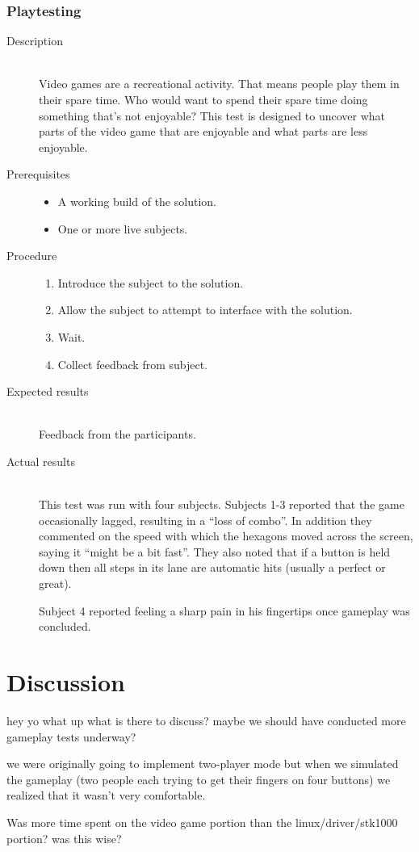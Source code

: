 	\subsubsection{Playtesting}
	\begin{description}
		\item[Description] \hfill \\
			Video games are a recreational activity.
			That means people play them in their spare time.
			Who would want to spend their spare time doing something that's not enjoyable?
			This test is designed to uncover what parts of the video game that are enjoyable and what parts are less enjoyable.
		\item[Prerequisites] \hfill
			\begin{itemize}
				\item{A working build of the solution.}
				\item{One or more live subjects.}
			\end{itemize}
		\item[Procedure] \hfill
			\begin{enumerate}
				\item{Introduce the subject to the solution.}
				\item{Allow the subject to attempt to interface with the solution.}
				\item{Wait.}
				\item{Collect feedback from subject.}
			\end{enumerate}
		\item[Expected results] \hfill \\
			Feedback from the participants.
		\item[Actual results] \hfill \\
			This test was run with four subjects.
			Subjects 1-3 reported that the game occasionally lagged, resulting in a ``loss of combo''.
			In addition they commented on the speed with which the hexagons moved across the screen, saying it ``might be a bit fast''.
			They also noted that if a button is held down then all steps in its lane are automatic hits (usually a perfect or great).

			Subject 4 reported feeling a sharp pain in his fingertips once gameplay was concluded.
	\end{description}


\section{Discussion}
	hey yo what up what is there to discuss?
	maybe we should have conducted more gameplay tests underway?

	we were originally going to implement two-player mode but when we simulated the gameplay (two people each trying to get their fingers on four buttons) we realized that it wasn't very comfortable.

	Was more time spent on the video game portion than the linux/driver/stk1000 portion? was this wise?